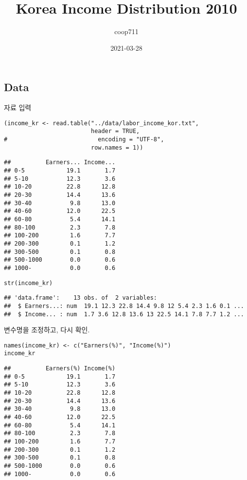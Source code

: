 \documentclass[
]{article}
\title{Korea Income Distribution 2010}
\author{coop711}
\date{2021-03-28}
\begin{document}
\maketitle

\hypertarget{data}{%
\subsection{Data}\label{data}}

자료 입력

\begin{verbatim}
(income_kr <- read.table("../data/labor_income_kor.txt", 
                         header = TRUE, 
#                          encoding = "UTF-8",
                         row.names = 1))
\end{verbatim}

\begin{verbatim}
##          Earners... Income...
## 0-5            19.1       1.7
## 5-10           12.3       3.6
## 10-20          22.8      12.8
## 20-30          14.4      13.6
## 30-40           9.8      13.0
## 40-60          12.0      22.5
## 60-80           5.4      14.1
## 80-100          2.3       7.8
## 100-200         1.6       7.7
## 200-300         0.1       1.2
## 300-500         0.1       0.8
## 500-1000        0.0       0.6
## 1000-           0.0       0.6
\end{verbatim}

\begin{verbatim}
str(income_kr)
\end{verbatim}

\begin{verbatim}
## 'data.frame':    13 obs. of  2 variables:
##  $ Earners...: num  19.1 12.3 22.8 14.4 9.8 12 5.4 2.3 1.6 0.1 ...
##  $ Income... : num  1.7 3.6 12.8 13.6 13 22.5 14.1 7.8 7.7 1.2 ...
\end{verbatim}

변수명을 조정하고, 다시 확인.

\begin{verbatim}
names(income_kr) <- c("Earners(%)", "Income(%)")
income_kr
\end{verbatim}

\begin{verbatim}
##          Earners(%) Income(%)
## 0-5            19.1       1.7
## 5-10           12.3       3.6
## 10-20          22.8      12.8
## 20-30          14.4      13.6
## 30-40           9.8      13.0
## 40-60          12.0      22.5
## 60-80           5.4      14.1
## 80-100          2.3       7.8
## 100-200         1.6       7.7
## 200-300         0.1       1.2
## 300-500         0.1       0.8
## 500-1000        0.0       0.6
## 1000-           0.0       0.6
\end{verbatim}
\end{document}
